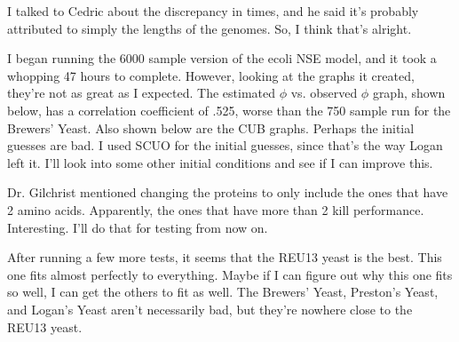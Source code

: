 \documentclass[12 pt]{article}
\begin{document}
\begin{enumerate}
				I talked to Cedric about the discrepancy in times, and he said it's probably attributed to simply the lengths of the genomes. So, I think that's alright.
				
				I began running the 6000 sample version of the ecoli NSE model, and it took a whopping 47 hours to complete. However, looking at the graphs it created, they're not as great as I expected. The estimated $ \phi $ vs. observed $ \phi $ graph, shown below, has a correlation coefficient of .525, worse than the 750 sample run for the Brewers' Yeast. Also shown below are the CUB graphs. Perhaps the initial guesses are bad. I used SCUO for the initial guesses, since that's the way Logan left it. I'll look into some other initial conditions and see if I can improve this.
				
				
				
				
				
				Dr. Gilchrist mentioned changing the proteins to only include the ones that have 2 amino acids. Apparently, the ones that have more than 2 kill performance. Interesting. I'll do that for testing from now on.
				
				After running a few more tests, it seems that the REU13 yeast is the best. This one fits almost perfectly to everything. Maybe if I can figure out why this one fits so well, I can get the others to fit as well. The Brewers' Yeast, Preston's Yeast, and Logan's Yeast aren't necessarily bad, but they're nowhere close to the REU13 yeast.
				
				
 			\end{enumerate} 
 			
\end{document}
